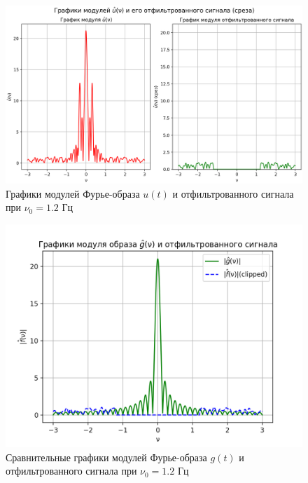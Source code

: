 \begin{figure}[ht!]
    \centering
    \includegraphics[scale=0.55]{media/1 task/low_freq/Fourier_Image_4_2_2-1,1981981981981982.png}
    \caption{Графики модулей Фурье-образа $u(t)$ и отфильтрованного сигнала при $\nu_0=1.2$ Гц}
    \label{fig:four_4_2_2_1.2}
\end{figure}

\begin{figure}[ht!]
    \centering
    \includegraphics[scale=0.55]{media/1 task/low_freq/Fourier_Image_Comparison_4_2_2-1,1981981981981982.png}
    \caption{Сравнительные графики модулей Фурье-образа $g(t)$ и отфильтрованного сигнала при $\nu_0=1.2$ Гц}
    \label{fig:fourc_4_2_2_1.2}
\end{figure}

